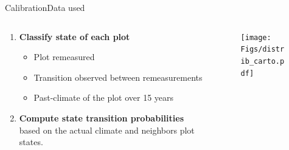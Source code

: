 \documentclass[10pt,aspectratio=149]{beamer}
\begin{document}

\begin{frame}{Calibration}{Data used}
	
	
	\begin{columns}[t]
	\begin{column}[c]{.45\paperwidth}
	\begin{enumerate}
			\item \textbf{Classify state of each plot}
		\begin{itemize}
			\item Plot remeasured
			\item Transition observed between remeasurements
			\item Past-climate of the plot over 15 years
		\end{itemize}
			\item \textbf{Compute state transition probabilities} based on the actual climate and neighbors plot states.
	\end{enumerate}

	\end{column}
	\begin{column}[c]{.50\paperwidth}
	\vspace{-3em}
		\begin{figure}
			\texttt{[image: Figs/distrib\_carto.pdf]}
		\end{figure}
	\end{column}
\end{columns}

\end{frame}


\end{document}
